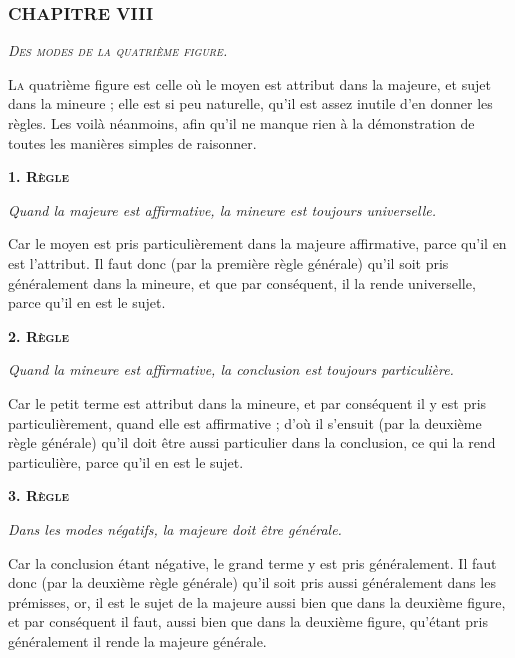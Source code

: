 \subsubsection{\centering \Large CHAPITRE VIII}
\begin{center}\emph{\large\scshape Des modes de la quatrième figure.}\end{center}

	\lettrine{L}{a} quatrième figure est celle où le moyen est attribut dans la majeure, et sujet dans la mineure ; elle est si peu naturelle, qu'il est assez inutile d'en donner les règles. Les voilà néanmoins, afin qu'il ne manque rien à la démonstration de toutes les manières simples de raisonner.

\begin{center}{\bfseries\scshape\large 1. Règle}\end{center}

	\emph{Quand la majeure est affirmative, la mineure est toujours universelle.}

Car le moyen est pris particulièrement dans la majeure affirmative, parce qu'il en est l'attribut. Il faut donc (par la première règle générale) qu'il soit pris généralement dans la mineure, et que par conséquent, il la rende universelle, parce qu'il en est le sujet.

\begin{center}{\bfseries\scshape\large 2. Règle}\end{center}

	\emph{Quand la mineure est affirmative, la conclusion est toujours particulière.}

Car le petit terme est attribut dans la mineure, et par conséquent il y est pris particulièrement, quand elle est affirmative ; d'où il s'ensuit (par la deuxième règle générale) qu'il doit être aussi particulier dans la conclusion, ce qui la rend particulière, parce qu'il en est le sujet.

\begin{center}{\bfseries\scshape\large 3. Règle}\end{center}

	\emph{Dans les modes négatifs, la majeure doit être générale.}

Car la conclusion étant négative, le grand terme y est pris généralement. Il faut donc (par la deuxième règle générale) qu'il soit pris aussi généralement dans les prémisses, or, il est le sujet de la majeure aussi bien que dans la deuxième figure, et par conséquent il faut, aussi bien que dans la deuxième figure, qu'étant pris généralement il rende la majeure générale.


